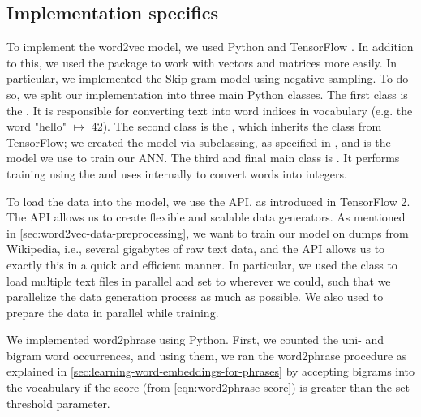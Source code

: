 \subsection{Implementation specifics}
\label{sec:word2vec-impl-specifics}
To implement the word2vec model, we used Python and TensorFlow \cite{tensorflow2015-whitepaper}. In addition to this, we used the  \cite{2020NumPy-Array} package to work with vectors and matrices more easily. In particular, we implemented the Skip-gram model using negative sampling. To do so, we split our implementation into three main Python classes. The first class is the . It is responsible for converting text into word indices in vocabulary (e.g. the word "hello" $\mapsto$ 42). The second class is the , which inherits the  class from TensorFlow; we created the model via subclassing, as specified in \cite{TensorflowSubclassing2020}, and is the model we use to train our ANN. The third and final main class is . It performs training using the  and uses  internally to convert words into integers.

To load the data into the model, we use the  API, as introduced in TensorFlow 2. The  API allows us to create flexible and scalable data generators. As mentioned in \cref{sec:word2vec-data-preprocessing}, we want to train our model on dumps from Wikipedia, i.e., several gigabytes of raw text data, and the  API allows us to exactly this in a quick and efficient manner. In particular, we used the  class to load multiple text files in parallel and set  to  wherever we could, such that we parallelize the data generation process as much as possible. We also used  to prepare the data in parallel while training.

We implemented word2phrase using Python. First, we counted the uni- and bigram word occurrences, and using them, we ran the word2phrase procedure as explained in \cref{sec:learning-word-embeddings-for-phrases} by accepting bigrams into the vocabulary if the score (from \cref{eqn:word2phrase-score}) is greater than the set threshold parameter.

